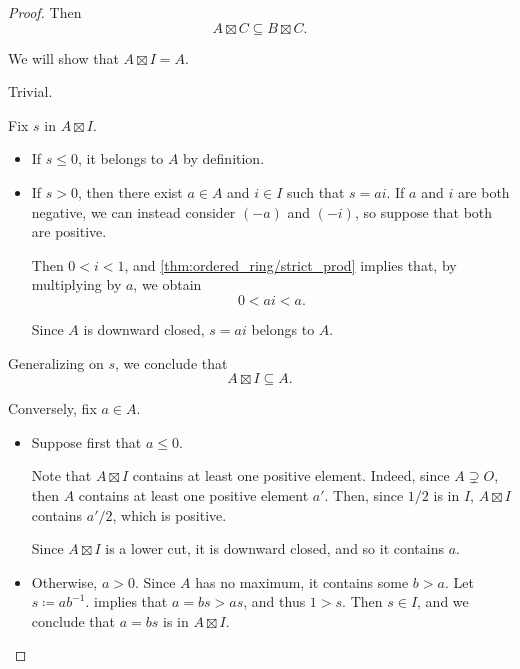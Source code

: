\begin{proof}
  Then
  \begin{equation*}
    A \boxtimes C \subseteq B \boxtimes C.
  \end{equation*}

   We will show that \( A \boxtimes I = A \).

   Trivial.

   Fix \( s \) in \( A \boxtimes I \).
  \begin{itemize}
    \item If \( s \leq 0 \), it belongs to \( A \) by definition.
    \item If \( s > 0 \), then there exist \( a \in A \) and \( i \in I \) such that \( s = ai \). If \( a \) and \( i \) are both negative, we can instead consider \( (-a) \) and \( (-i) \), so suppose that both are positive.

    Then \( 0 < i < 1 \), and \cref{thm:ordered_ring/strict_prod} implies that, by multiplying by \( a \), we obtain
    \begin{equation*}
      0 < ai < a.
    \end{equation*}

    Since \( A \) is downward closed, \( s = ai \) belongs to \( A \).
  \end{itemize}

  Generalizing on \( s \), we conclude that
  \begin{equation*}
    A \boxtimes I \subseteq A.
  \end{equation*}

  Conversely, fix \( a \in A \).
  \begin{itemize}
    \item Suppose first that \( a \leq 0 \).

    Note that \( A \boxtimes I \) contains at least one positive element. Indeed, since \( A \supsetneq O \), then \( A \) contains at least one positive element \( a' \). Then, since \( 1 / 2 \) is in \( I \), \( A \boxtimes I \) contains \( a' / 2 \), which is positive.

    Since \( A \boxtimes I \) is a lower cut, it is downward closed, and so it contains \( a \).

    \item Otherwise, \( a > 0 \). Since \( A \) has no maximum, it contains some \( b > a \). Let \( s \coloneqq a b^{-1} \).  implies that \( a = b s > a s \), and thus \( 1 > s \). Then \( s \in I \), and we conclude that \( a = b s \) is in \( A \boxtimes I \).
  \end{itemize}


\end{proof}
